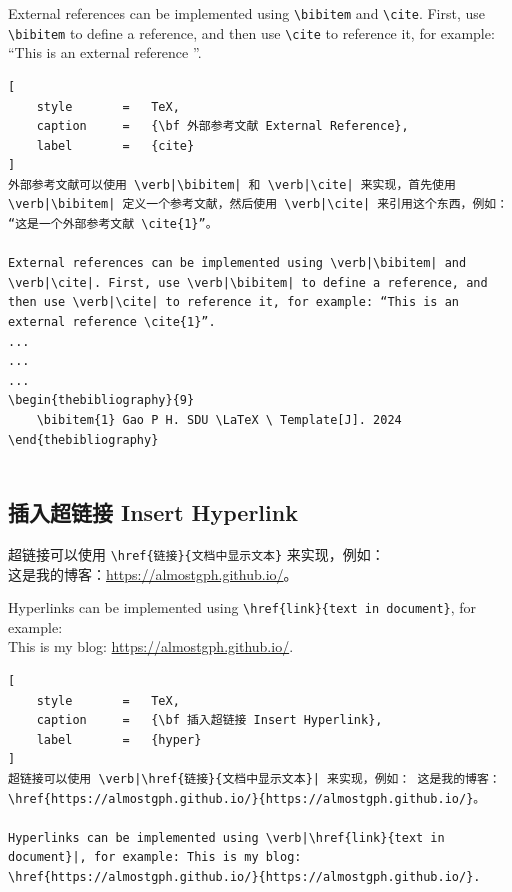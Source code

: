 \documentclass{article}
\begin{document}
External references can be implemented using \verb|\bibitem| and \verb|\cite|. First, use \verb|\bibitem| to define a reference, and then use \verb|\cite| to reference it, for example: “This is an external reference \cite{1}”.

\clearpage

\begin{lstlisting}[
    style       =   TeX,
    caption     =   {\bf 外部参考文献 External Reference},
    label       =   {cite}
]
外部参考文献可以使用 \verb|\bibitem| 和 \verb|\cite| 来实现，首先使用 \verb|\bibitem| 定义一个参考文献，然后使用 \verb|\cite| 来引用这个东西，例如： “这是一个外部参考文献 \cite{1}”。

External references can be implemented using \verb|\bibitem| and \verb|\cite|. First, use \verb|\bibitem| to define a reference, and then use \verb|\cite| to reference it, for example: “This is an external reference \cite{1}”.
...
...
...
\begin{thebibliography}{9}
    \bibitem{1} Gao P H. SDU \LaTeX \ Template[J]. 2024
\end{thebibliography}


\end{lstlisting}

\subsection{插入超链接 Insert Hyperlink}

超链接可以使用 \verb|\href{链接}{文档中显示文本}| 来实现，例如： \\这是我的博客：\href{https://almostgph.github.io/}{https://almostgph.github.io/}。

Hyperlinks can be implemented using \verb|\href{link}{text in document}|, for example: \\This is my blog: \href{https://almostgph.github.io/}{https://almostgph.github.io/}.

\begin{lstlisting}[
    style       =   TeX,
    caption     =   {\bf 插入超链接 Insert Hyperlink},
    label       =   {hyper}
]
超链接可以使用 \verb|\href{链接}{文档中显示文本}| 来实现，例如： 这是我的博客：\href{https://almostgph.github.io/}{https://almostgph.github.io/}。

Hyperlinks can be implemented using \verb|\href{link}{text in document}|, for example: This is my blog: \href{https://almostgph.github.io/}{https://almostgph.github.io/}.
\end{lstlisting}
\end{document}
